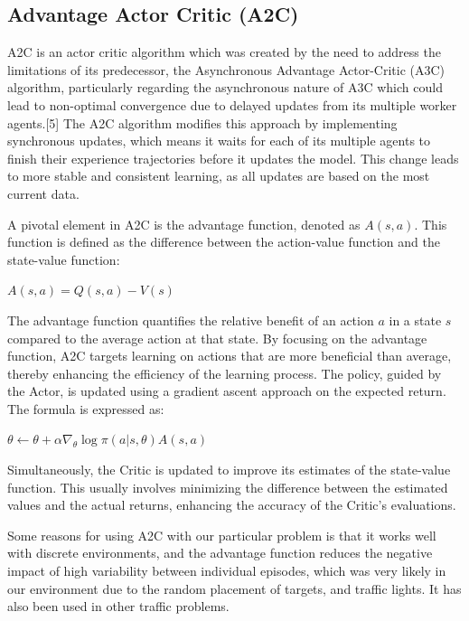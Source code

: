 \documentclass{article}
\begin{document}
    \subsection{Advantage Actor Critic (A2C)}
    \label{a2c}
    A2C is an actor critic algorithm which was created by the need to address the limitations of its predecessor, the Asynchronous Advantage Actor-Critic (A3C) algorithm, particularly regarding the asynchronous nature of A3C which could lead to non-optimal convergence due to delayed updates from its multiple worker agents.[5] The A2C algorithm modifies this approach by implementing synchronous updates, which means it waits for each of its multiple agents to finish their experience trajectories before it updates the model. This change leads to more stable and consistent learning, as all updates are based on the most current data.

    A pivotal element in A2C is the advantage function, denoted as \( A(s, a) \). This function is defined as the difference between the action-value function and the state-value function: 
    
    \begin{center}
        $A(s, a) = Q(s, a) - V(s)$
    \end{center}
    
    The advantage function quantifies the relative benefit of an action \( a \) in a state \( s \) compared to the average action at that state. By focusing on the advantage function, A2C targets learning on actions that are more beneficial than average, thereby enhancing the efficiency of the learning process. The policy, guided by the Actor, is updated using a gradient ascent approach on the expected return. The formula is expressed as: 
    \begin{center}
        $\theta \leftarrow \theta + \alpha \nabla_{\theta} \log \pi(a | s, \theta) A(s, a)$
    \end{center}
    
    Simultaneously, the Critic is updated to improve its estimates of the state-value function. This usually involves minimizing the difference between the estimated values and the actual returns, enhancing the accuracy of the Critic's evaluations.
    
    Some reasons for using A2C with our particular problem is that it works well with discrete environments, and the advantage function reduces the negative impact of high variability between individual episodes, which was very likely in our environment due to the random placement of targets, and traffic lights. It has also been used in other traffic problems.
\end{document}
